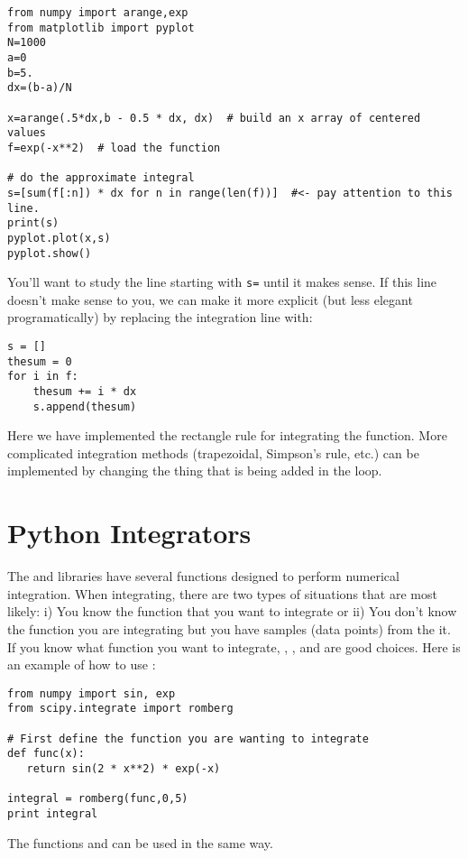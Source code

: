 \begin{Verbatim}
from numpy import arange,exp
from matplotlib import pyplot
N=1000
a=0
b=5.
dx=(b-a)/N

x=arange(.5*dx,b - 0.5 * dx, dx)  # build an x array of centered values
f=exp(-x**2)  # load the function

# do the approximate integral
s=[sum(f[:n]) * dx for n in range(len(f))]  #<- pay attention to this line.
print(s)
pyplot.plot(x,s)
pyplot.show()
\end{Verbatim}
You'll want to study the line starting with \verb!s=! until it makes
sense.  If this line doesn't make sense to you, we can make it more
explicit (but less elegant programatically) by replacing the
integration line with:
\begin{Verbatim}
s = []
thesum = 0
for i in f:
    thesum += i * dx
    s.append(thesum)
\end{Verbatim}

Here we have implemented the rectangle rule for integrating the function.
More complicated integration methods (trapezoidal, Simpson's rule,
etc.) can be implemented by changing the thing that is being added in
the loop.

\section{Python Integrators}
The  and  libraries have several functions
designed to perform numerical integration.  When integrating, there
are two types of situations that are most likely: i) You know the
function that you want to integrate or ii) You don't know the
function you are integrating but you have samples (data points) from the it.
If you know what function you want to integrate,
,
, and  are good choices.  Here is an
example of how to use :
\begin{Verbatim}
from numpy import sin, exp
from scipy.integrate import romberg

# First define the function you are wanting to integrate
def func(x):
   return sin(2 * x**2) * exp(-x)

integral = romberg(func,0,5)
print integral
\end{Verbatim}
The functions  and  can be used in the
same way.


